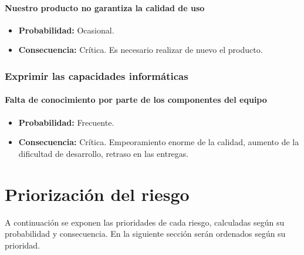 \documentclass[spanish,a4paper,11pt, twoside]{report}	%
\begin{document}
	\subsection*{Nuestro producto no garantiza la calidad de uso}	
		\begin{itemize}
			\item \textbf {Probabilidad: }Ocasional.
			\item \textbf {Consecuencia: }Crítica. Es necesario realizar de nuevo el producto.
		\end{itemize}
		


%
\section{Exprimir las capacidades informáticas}

	\subsection*{Falta de conocimiento por parte de los componentes del equipo}	
		\begin{itemize}
			\item \textbf {Probabilidad: }Frecuente.
			\item \textbf {Consecuencia: }Crítica. Empeoramiento enorme de la calidad, aumento de la dificultad de desarrollo, retraso en las entregas.
		\end{itemize}
	



\newpage
\mbox{}
\thispagestyle{empty}						%
\newpage

\part{Priorización del riesgo}

%
\setcounter{section}{0}
A continuación se exponen las prioridades de cada riesgo, calculadas según su probabilidad y consecuencia. En la siguiente
sección serán ordenados según su prioridad.
\end{document}
